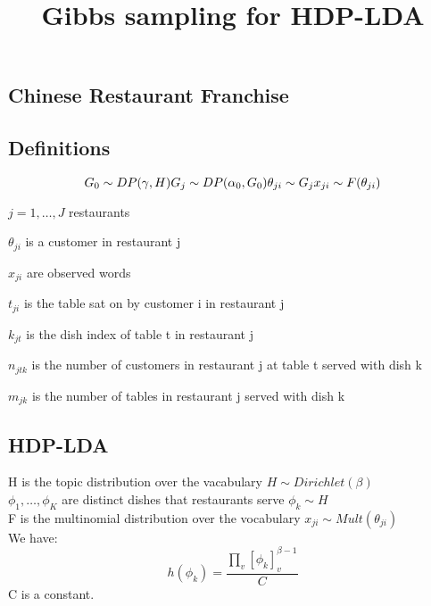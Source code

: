 \documentclass[11pt]{article}
\date{\vspace{-5ex}}
\begin{document}
\newcommand\ddfrac[2]{\frac{\displaystyle #1}{\displaystyle #2}}
\begin{spacing}{1.6}
\title{Gibbs sampling for HDP-LDA}
\maketitle

\section{Chinese Restaurant Franchise}
\noindent 
\subsection{Definitions}
\begin{equation}
G_0 \sim DP(\gamma,H)\\
G_j \sim DP(\alpha_0,G_0) \\
\theta_{ji} \sim G_j \\
x_{ji} \sim F(\theta_{ji}) 
\end{equation}

$j=1,\ldots,J$ restaurants

$\theta_{ji}$ is a customer in restaurant j

$x_{ji}$ are observed words

$t_{ji}$ is the table sat on by customer i in restaurant j

$k_{jt}$ is the dish index of table t in restaurant j

$n_{jtk}$ is the number of customers in restaurant j at table t served with dish k

$m_{jk}$ is the number of tables in restaurant j served with dish k

\subsection{HDP-LDA}
H is the topic distribution over the vacabulary $H \sim Dirichlet(\beta)$ \\
$\phi_1,\ldots,\phi_K$ are distinct dishes that restaurants serve $\phi_k \sim H$ \\
F is the multinomial distribution over the vocabulary $x_{ji} \sim Mult(\theta_{ji})$\\
We have:
\begin{equation} \label{eq1}
h(\phi_k)=\frac{\prod_v [\phi_k]^{\beta-1}_v }{C}
\end{equation} C is a constant.\\


\end{spacing}
\end{document}
